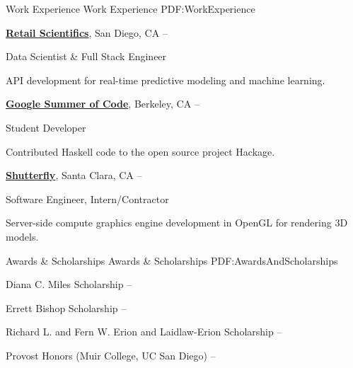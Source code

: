 \documentclass[letterpaper,MMMyyyy,nonstopmode]{simpleresumecv}
\begin{document}
\begin{Body}

\Section
{Work Experience}
{Work Experience}
{PDF:WorkExperience}

\Entry
\href{https://www.retailscientifics.com/}
{\textbf{Retail Scientifics}},
San Diego, CA
\hfill
{} --

\Gap
\BulletItem
Data Scientist \& Full Stack Engineer

\begin{Detail}
\SubBulletItem
API development for real-time predictive modeling and machine learning.
\end{Detail}

\BigGap
\Entry
\href{https://summerofcode.withgoogle.com/archive/}
{\textbf{Google Summer of Code}},
Berkeley, CA
\hfill
{} --

\Gap
\BulletItem
Student Developer

\begin{Detail}
\SubBulletItem
Contributed Haskell code to the open source project Hackage.
\end{Detail}


\BigGap
\Entry
\href{http://www.shutterfly.com/}
{\textbf{Shutterfly}},
Santa Clara, CA
\hfill
{} --

\Gap
\BulletItem
Software Engineer, Intern/Contractor
\begin{Detail}
\SubBulletItem
Server-side compute graphics engine development in OpenGL for rendering 3D models.
\end{Detail}


\Section
{Awards \&\newline
Scholarships}
{Awards \& Scholarships}
{PDF:AwardsAndScholarships}

\BulletItem
Diana C. Miles Scholarship
\hfill{} -- 

\BulletItem
Errett Bishop Scholarship
\hfill{} -- 

\BulletItem
Richard L. and Fern W. Erion and Laidlaw-Erion Scholarship
\hfill{} -- 

\BulletItem
Provost Honors (Muir College, UC San Diego)
\hfill{} -- 


\end{Body}
\end{document}
